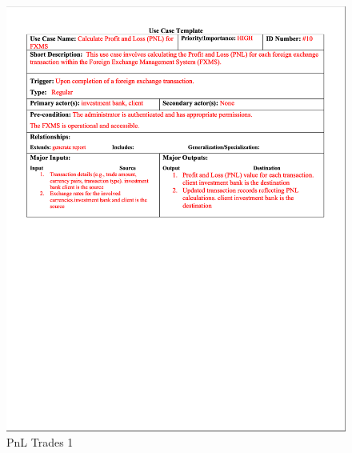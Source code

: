 \documentclass[a4paper]{report}
\begin{document}
\begin{figure}[h!]
    \centering
    \includegraphics[width=\textwidth]{images/uc/10.1-pnl-trades.png}
    \caption{PnL Trades 1}
    \label{fig:10.1-pnl-trades}
\end{figure}
\end{document}

